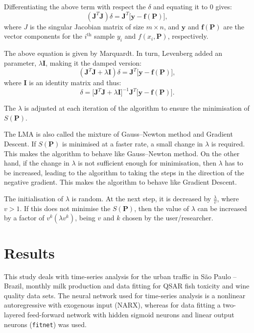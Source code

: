 Differentiating the above term with respect the $\delta$ and equating it to 0 gives:
\begin{equation}
    (\mathbf{J}^T\mathbf{J})\delta=\mathbf{J}^T\Big[ \mathbf{y}-\mathbf{f}(\mathbf{P})  \Big],
\end{equation}
where $J$ is the singular Jacobian matrix of size  $m \times n$, and $\mathbf{y}$ and $\mathbf{f}(\mathbf{P})$ are the vector components for the $i^{\text{th}}$ sample $y_i$ and $f(x_i,\mathbf{P})$, respectively.

The above equation is given by Marquardt. In turn, Levenberg added an parameter, $\lambda \mathbf{I}$, making it the damped version:
\begin{equation}
    (\mathbf{J}^T\mathbf{J}+ \lambda \mathbf{I})\delta=\mathbf{J}^T\Big[ \mathbf{y}-\mathbf{f}(\mathbf{P})  \Big],
\end{equation}
where $\mathbf{I}$ is an identity matrix and thus:
\begin{equation}
\delta= \Big [\mathbf{J}^T\mathbf{J}+ \lambda \mathbf{I} \Big]^{-1} \mathbf{J}^T\Big[ \mathbf{y}-\mathbf{f}(\mathbf{P})  \Big].
\end{equation}

The $\lambda$ is adjusted at each iteration of the algorithm to ensure the minimisation of $S(\mathbf{P})$. 

The LMA is also called the mixture of Gauss--Newton method and Gradient Descent. If $S(\mathbf{P})$ is minimised at a faster rate, a small change in $\lambda$ is required. This makes the algorithm to behave like Gauss--Newton method. On the other hand, if the change in $\lambda$ is not sufficient enough for minimisation, then $\lambda$ has to be increased, leading to the algorithm to taking the steps in the direction of the negative gradient. This makes the algorithm to behave like Gradient Descent.

The initialisation of $\lambda$ is random. At the next step, it is decreased by $\frac{\lambda}{v}$, where $v>1$. If this does not minimise the $S(\mathbf{P})$, then the value of $\lambda$ can be increased by a factor of $v^k(\lambda v^k)$, being $v$ and $k$ chosen by the user/researcher.

\section{Results}\label{sec:results}

This study deals with time-series analysis for the urban traffic in São Paulo -- Brazil, monthly milk production and data fitting for QSAR fish toxicity and wine quality data sets. The neural network used for time-series analysis is a nonlinear autoregressive with exogenous input (NARX), whereas for data fitting a two-layered feed-forward network with hidden sigmoid neurons and linear output neurons (\texttt{fitnet}) was used.

